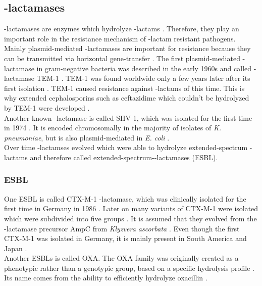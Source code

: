 \subsection{\textbeta-lactamases}
\label{section:resistance_mechanisms}
\textbeta-lactamases are enzymes which hydrolyze \textbeta-lactams \cite{fisher_bacterial_2005}. Therefore, they play an important role in the resistance mechanism of \textbeta-lactam resistant pathogens. 
Mainly plasmid-mediated \textbeta-lactamases are important for resistance because they can be transmitted via horizontal gene-transfer \cite{munita_mechanisms_2016}.  
The first plasmid-mediated \textbeta-lactamase in gram-negative bacteria was described in the early 1960s and called \textbeta-lactamase TEM-1  \cite{fernandes_-lactams:_2013}. TEM-1 was found worldwide only a few years later after its first isolation \cite{fernandes_-lactams:_2013}. TEM-1 caused resistance against \textbeta-lactams of this time.  This is why extended cephalosporins such as ceftazidime which couldn't be hydrolyzed by TEM-1 were developed \cite{fernandes_-lactams:_2013}. \\
Another known \textbeta-lactamase is called SHV-1, which was isolated for the first time in 1974 \cite{kuzin_structure_1999}. It is encoded chromosomally in the majority of isolates of \textit{K. pneumoniae}, but is also plasmid-mediated in \textit{E. coli} \cite{kuzin_structure_1999}. \\
Over time \textbeta-lactamses evolved which were able to hydrolyze extended-spectrum \textbeta-lactams and therefore called extended-spectrum-\textbeta-lactamases (ESBL).  

\subsubsection{ESBL}
One ESBL is called CTX-M-1 \textbeta-lactamase, which was clinically isolated for the first time in Germany in 1986 \cite{bradford_extended-spectrum_2001}. Later on many variants of CTX-M-1 were isolated which were subdivided into five groups \cite{fernandes_-lactams:_2013}.
It is assumed that they evolved from the \textbeta-lactamase precursor AmpC from \textit{Klyzvera ascorbata}  \cite{bradford_extended-spectrum_2001}. Even though the first CTX-M-1 was isolated in Germany, it is mainly present in South America and Japan \cite{bradford_extended-spectrum_2001}. \\
Another ESBLs is called OXA.
The OXA family was originally created as a phenotypic rather than a genotypic group, based on a specific hydrolysis profile \cite{bradford_extended-spectrum_2001}. Its name comes from the ability to efficiently hydrolyze oxacillin \cite{bradford_extended-spectrum_2001}. \\

